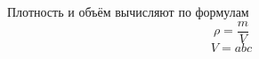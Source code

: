 Плотность и объём вычисляют по формулам
\begin{equation} %
    \rho = \frac{m}{V}
\end{equation}
\begin{equation}
    V = a b c
\end{equation}
